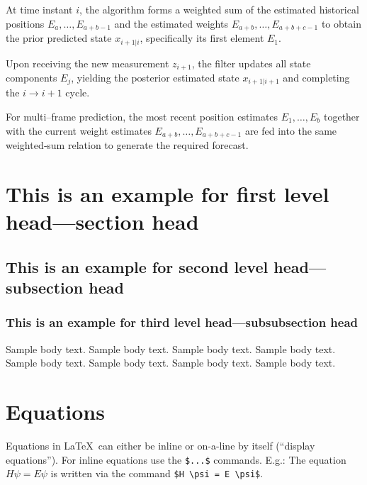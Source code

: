 \documentclass[sn-nature]{sn-jnl}%
\theoremstyle{thmstyleone}%
\theoremstyle{thmstyletwo}%
\theoremstyle{thmstylethree}%
\begin{document}
At time instant \(i\), the algorithm forms a weighted sum of the estimated historical positions  
\(E_{a},\dots,E_{a+b-1}\)  and the estimated weights  
\(E_{a+b},\dots,E_{a+b+c-1}\)  
to obtain the prior predicted state \(x_{i+1|i}\), specifically its first element \(E_1\). 

Upon receiving the new measurement \(z_{i+1}\), the filter updates all state components \(E_j\), yielding the posterior estimated state \(x_{i+1|i+1}\) and completing the \(i\!\rightarrow\!i+1\) cycle.

For multi–frame prediction, the most recent position estimates \(E_{1},\dots,E_{b}\) together with the current weight estimates \(E_{a+b},\dots,E_{a+b+c-1}\) are fed into the same weighted‐sum relation to generate the required forecast.



\section{This is an example for first level head---section head}\label{sec3}

\subsection{This is an example for second level head---subsection head}\label{subsec2}

\subsubsection{This is an example for third level head---subsubsection head}\label{subsubsec2}

Sample body text. Sample body text. Sample body text. Sample body text. Sample body text. Sample body text. Sample body text. Sample body text. 

\section{Equations}\label{sec4}

Equations in \LaTeX\ can either be inline or on-a-line by itself (``display equations''). For
inline equations use the \verb+$...$+ commands. E.g.: The equation
$H\psi = E \psi$ is written via the command \verb+$H \psi = E \psi$+.
\end{document}
